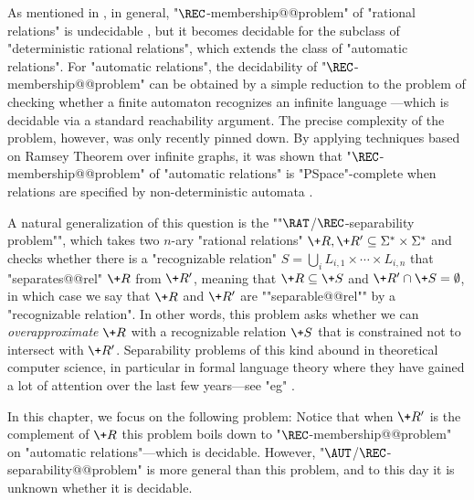 As mentioned in , in general, "$\REC$-membership@@problem" of "rational relations" is undecidable
\cite[\S~III, Theorem~8.4]{Berstel1979Transductions},
but it becomes decidable  for the subclass of 
"deterministic rational relations", which extends the class of "automatic relations".
For "automatic relations", the decidability of "$\REC$-membership@@problem"
can be obtained by a  simple reduction to the problem of checking whether a finite automaton 
recognizes an infinite language \cite{LodingSpinrath2019DecisionProblems}---which is decidable via 
a standard reachability argument. 
The precise complexity of the problem, however, was only recently pinned down.
By applying techniques based on Ramsey Theorem over infinite graphs, it was shown that 
"$\REC$-membership@@problem" of "automatic relations" is 
"PSpace"-complete when relations are specified by non-deterministic automata
\cite[Theorem 1]{BarceloHongLeLinNiskanen2019MonadicDecomposability} \cite[Corollary 2.9]{BergstrasserGanardiLinZetzsche2022RamseyQuantifiers}.

\AP A natural generalization of this question is the
""$\RAT$/$\REC$-separability problem"", which takes two $n$-ary "rational relations" 
$\+R,\+R' \subseteq \Sigma^* \times \Sigma^*$ and checks whether there is a "recognizable relation" 
$S = \bigcup_i L_{i,1} \times \cdots \times L_{i,n}$ that "separates@@rel" $\+R$ from $\+R'$, meaning that $\+R \subseteq \+S$ and $\+R' \cap \+S = \emptyset$, in which case we say that $\+R$
and $\+R'$ are \AP""separable@@rel"" by a "recognizable relation".
In other words, this problem asks whether we can \emph{overapproximate} $\+R$ with a recognizable 
relation $\+S$ that is constrained not to intersect with $\+R'$. Separability problems of this kind abound in theoretical computer science, in particular
in formal language theory where they have gained a lot of attention over the last few years---see "eg" \cite{PlaceZeitoun2016SeparatingRegularLanguages,Kopczynski2016InvisiblePushdownLanguages,CzerwinskiMartensRooijenZeitounZetzsche2017DecidableSeparabilityPiecewiseTestable,ClementeCzerwinskiLasotaPaperman2017RegularSeparabilityParikhAutomata}. 

In this chapter, we focus on the following problem:
Notice that when $\+R'$ is the complement of $\+R$ this problem boils down to "$\REC$-membership@@problem" on "automatic relations"---which is decidable. 
However, "$\AUT$/$\REC$-separability@@problem" is more general than this problem,
and to this day it is unknown whether it is decidable. 


